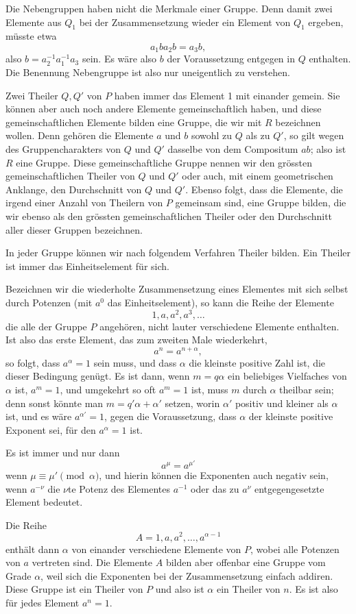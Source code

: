 \documentclass[11pt]{article}
\begin{document}
Die Nebengruppen haben nicht die Merkmale einer Gruppe. Denn damit zwei Elemente aus $Q_1$ bei der Zusammensetzung wieder ein Element von $Q_1$ ergeben, müsste etwa
\[
a_1ba_2b=a_3b,
\]
also $b=a_2^{-1}a_1^{-1}a_3$ sein. Es wäre also $b$ der Voraussetzung entgegen in $Q$ enthalten. Die Benennung Nebengruppe ist also nur uneigentlich zu verstehen.

Zwei Theiler $Q,Q'$ von $P$ haben immer das Element 1 mit einander gemein. Sie können aber auch noch andere Elemente gemeinschaftlich haben, und diese gemeinschaftlichen Elemente bilden eine Gruppe, die wir mit $R$ bezeichnen wollen. Denn gehören die Elemente $a$ und $b$ sowohl zu $Q$ als zu $Q'$, so gilt wegen des Gruppencharakters von $Q$ und $Q'$ dasselbe von dem Compositum $ab$; also ist $R$ eine Gruppe. Diese gemeinschaftliche Gruppe nennen wir den grössten gemeinschaftlichen Theiler von $Q$ und $Q'$ oder auch, mit einem geometrischen Anklange, den Durchschnitt von $Q$ und $Q'$. Ebenso folgt, dass die Elemente, die irgend einer Anzahl von Theilern von $P$ gemeinsam sind, eine Gruppe bilden, die wir ebenso als den grössten gemeinschaftlichen Theiler oder den Durchschnitt aller dieser Gruppen bezeichnen.

In jeder Gruppe können wir nach folgendem Verfahren Theiler bilden. Ein Theiler ist immer das Einheitselement für sich.

Bezeichnen wir die wiederholte Zusammensetzung eines Elementes mit sich selbst durch Potenzen (mit $a^0$ das Einheitselement), so kann die Reihe der Elemente
\[
1,a,a^2,a^3,\ldots
\]
die alle der Gruppe $P$ angehören, nicht lauter verschiedene Elemente enthalten. Ist also das erste Element, das zum zweiten Male wiederkehrt,
\[
a^n=a^{n+\alpha},
\]
so folgt, dass $a^\alpha=1$ sein muss, und dass $\alpha$ die kleinste positive Zahl ist, die dieser Bedingung genügt. Es ist dann, wenn $m=q\alpha$ ein beliebiges Vielfaches von $\alpha$ ist, $a^m=1$, und umgekehrt so oft $a^m=1$ ist, muss $m$ durch $\alpha$ theilbar sein; denn sonst könnte man $m=q'\alpha+\alpha'$ setzen, worin $\alpha'$ positiv und kleiner als $\alpha$ ist, und es wäre $a^{\alpha'}=1$, gegen die Voraussetzung, dass $\alpha$ der kleinste positive Exponent sei, für den $a^\alpha=1$ ist.

Es ist immer und nur dann
\[
a^\mu=a^{\mu'}
\]
wenn $\mu\equiv\mu'\pmod{\alpha}$, und hierin können die Exponenten auch negativ sein, wenn $a^{-\nu}$ die $\nu$te Potenz des Elementes $a^{-1}$ oder das zu $a^\nu$ entgegengesetzte Element bedeutet.

Die Reihe
\[
A=1,a,a^2,\ldots,a^{\alpha-1}
\]
enthält dann $\alpha$ von einander verschiedene Elemente von $P$, wobei alle Potenzen von $a$ vertreten sind. Die Elemente $A$ bilden aber offenbar eine Gruppe vom Grade $\alpha$, weil sich die Exponenten bei der Zusammensetzung einfach addiren. Diese Gruppe ist ein Theiler von $P$ und also ist $\alpha$ ein Theiler von $n$. Es ist also für jedes Element $a^n=1$.
\end{document}
